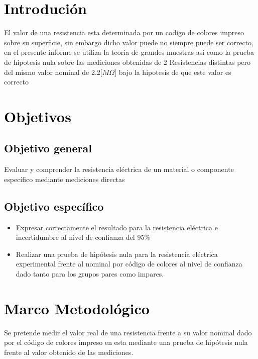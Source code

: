 \documentclass[11pt]{article}
\begin{document}
    \begin{multicols}{2}
        \section{\textbf{\textcolor{black}{Introdución}}}
        \noindent El valor de una resistencia esta determinada por un codigo de colores impreso
        sobre su superficie, sin embargo dicho valor puede no siempre puede ser correcto, en el
        presente informe se utiliza la teoria de grandes muestras asi como la prueba de hipotesis
        nula sobre las mediciones obtenidas de 2 Resistencias distintas pero del mismo valor
        nominal de 2.2[$M\Omega$] bajo la hipotesis de que este valor es correcto

        \section{\textbf{\textcolor{black}{Objetivos}}}

        \subsection{\textcolor{black}{Objetivo general}}
        \noindent Evaluar y comprender la resistencia eléctrica de un material o componente
        específico mediante mediciones directas

        \subsection{\textbf{\textcolor{black}{Objetivo específico}}}
        \noindent
        \begin{itemize}
            \item Expresar correctamente el resultado para la resistencia eléctrica e incertidumbre
            al nivel de confianza del 95\%
            \item Realizar una prueba de hipótesis nula para la resistencia eléctrica experimental frente al nominal
            por código de colores al nivel de confianza dado
            tanto para los grupos pares como impares.
        \end{itemize}


        \section{\textbf{\textcolor{black}{Marco Metodológico}}}
        Se pretende medir el valor real de una resistencia frente a su valor nominal dado por el código de colores impreso en esta
        mediante una prueba de hipótesis nula frente al valor obtenido de las mediciones.



\end{multicols}
\end{document}
